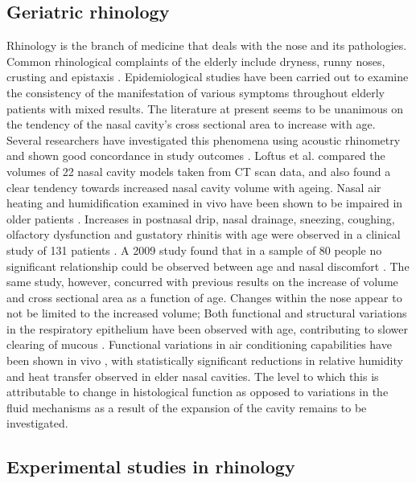 \subsection{Geriatric rhinology}
Rhinology is the branch of medicine that deals with the nose and its pathologies. 
Common rhinological complaints of the elderly include dryness, runny noses, crusting and epistaxis \cite{Varga-Huettner2013}. Epidemiological studies have been carried out to examine the consistency of the manifestation of various symptoms throughout elderly patients with mixed results. 
The literature at present seems to be unanimous on the tendency of the nasal cavity's cross sectional area to increase with age. Several researchers have investigated this phenomena using acoustic rhinometry and shown good concordance in study outcomes \cite{Kalmovich2005, Edelstein1996,WhanKim2007,Lindemann2008}. Loftus et al. \cite{Loftus2016} compared the volumes of 22 nasal cavity models taken from CT scan data, and also found a clear tendency towards increased nasal cavity volume with ageing. Nasal air heating and humidification examined in vivo have been shown to be impaired in older patients \cite{Lindemann2008}. 
Increases in postnasal drip, nasal drainage, sneezing, coughing, olfactory dysfunction and gustatory rhinitis with age were observed in a clinical study of 131 patients \cite{Edelstein1996}. A 2009 study found that in a sample of 80 people no significant relationship could be observed between age and nasal discomfort \cite{Lindemann2010}. The same study, however, concurred with previous results on the increase of volume and cross sectional area as a function of age. Changes within the nose appear to not be limited to the increased volume; Both functional and structural variations in the respiratory epithelium have been observed with age, contributing to slower clearing of mucous \cite{HO2001}. 
Functional variations in air conditioning capabilities have been shown in vivo \cite{Lindemann2008}, with statistically significant reductions in relative humidity and heat transfer observed in elder nasal cavities. The level to which this is attributable to change in histological function as opposed to variations in the fluid mechanisms as a result of the expansion of the cavity remains to be investigated.

 \subsection{Experimental studies in rhinology}
 
